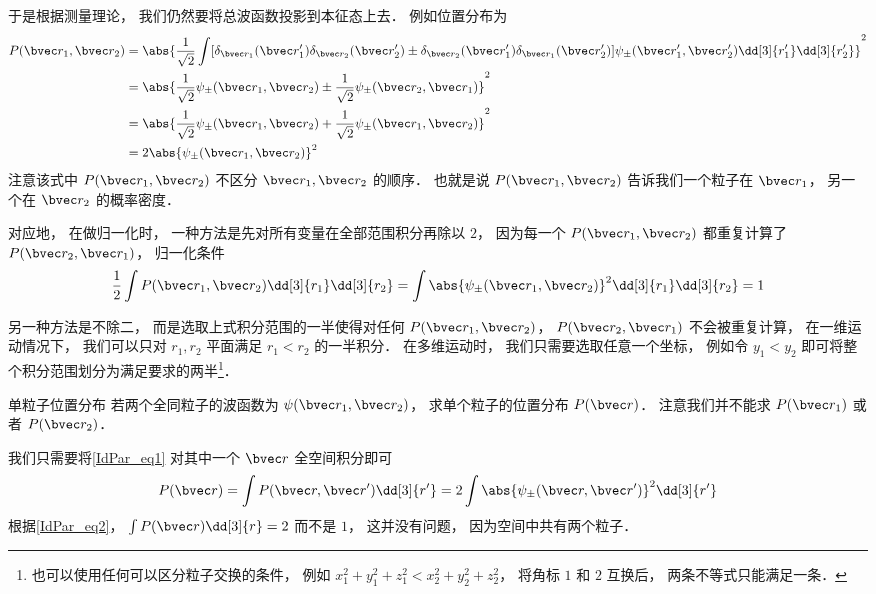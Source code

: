 于是根据测量理论， 我们仍然要将总波函数投影到本征态上去． 例如位置分布为
\begin{equation}\label{IdPar_eq1}
\begin{aligned}
P(\bvec r_1, \bvec r_2) &= \abs{\frac{1}{\sqrt{2}}\int [\delta_{\bvec r_1}(\bvec r'_1) \delta_{\bvec r_2}(\bvec r'_2) \pm \delta_{\bvec r_2}(\bvec r'_1) \delta_{\bvec r_1}(\bvec r'_2)] \psi_\pm(\bvec r'_1,\bvec r'_2) \dd[3]{r'_1}\dd[3]{r'_2}}^2\\
&= \abs{\frac{1}{\sqrt{2}} \psi_\pm(\bvec r_1, \bvec r_2) \pm  \frac{1}{\sqrt{2}} \psi_\pm(\bvec r_2, \bvec r_1)}^2\\
&= \abs{\frac{1}{\sqrt{2}} \psi_\pm(\bvec r_1, \bvec r_2) +  \frac{1}{\sqrt{2}} \psi_\pm(\bvec r_1, \bvec r_2)}^2\\
&= 2\abs{\psi_\pm(\bvec r_1, \bvec r_2)}^2
\end{aligned}
\end{equation}
注意该式中 $P(\bvec r_1, \bvec r_2)$ 不区分 $\bvec r_1, \bvec r_2$ 的顺序． 也就是说 $P(\bvec r_1, \bvec r_2)$ 告诉我们一个粒子在 $\bvec r_1$， 另一个在 $\bvec r_2$ 的概率密度．

对应地， 在做归一化时， 一种方法是先对所有变量在全部范围积分再除以 $2$， 因为每一个 $P(\bvec r_1, \bvec r_2)$ 都重复计算了 $P(\bvec r_2, \bvec r_1)$， 归一化条件
\begin{equation}\label{IdPar_eq2}
\frac{1}{2}\int P(\bvec r_1, \bvec r_2) \dd[3]{r_1}\dd[3]{r_2} = \int \abs{\psi_\pm(\bvec r_1, \bvec r_2)}^2 \dd[3]{r_1}\dd[3]{r_2} = 1
\end{equation}

另一种方法是不除二， 而是选取上式积分范围的一半使得对任何 $P(\bvec r_1, \bvec r_2)$， $P(\bvec r_2, \bvec r_1)$ 不会被重复计算， 在一维运动情况下， 我们可以只对 $r_1, r_2$ 平面满足 $r_1 < r_2$ 的一半积分． 在多维运动时， 我们只需要选取任意一个坐标， 例如令 $y_1 < y_2$ 即可将整个积分范围划分为满足要求的两半\footnote{也可以使用任何可以区分粒子交换的条件， 例如 $x_1^2 + y_1^2 + z_1^2 < x_2^2 + y_2^2 + z_2^2$， 将角标 $1$ 和 $2$ 互换后， 两条不等式只能满足一条．}．

\begin{example}{单粒子位置分布}\label{IdPar_ex1}
若两个全同粒子的波函数为 $\psi(\bvec r_1,\bvec r_2)$， 求单个粒子的位置分布 $P(\bvec r)$． 注意我们并不能求 $P(\bvec r_1)$ 或者 $P(\bvec r_2)$．

我们只需要将\autoref{IdPar_eq1} 对其中一个 $\bvec r$ 全空间积分即可
\begin{equation}
P(\bvec r) = \int P(\bvec r, \bvec r') \dd[3]{r'} = 2\int \abs{\psi_\pm(\bvec r, \bvec r')}^2 \dd[3]{r'} 
\end{equation}
根据\autoref{IdPar_eq2}， $\int P(\bvec r) \dd[3]{r} = 2$ 而不是 $1$， 这并没有问题， 因为空间中共有两个粒子．
\end{example}

